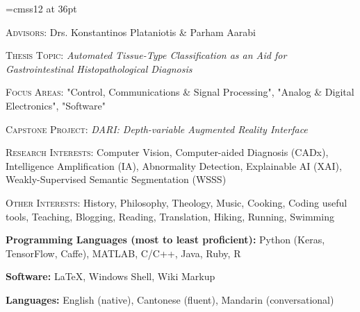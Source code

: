 \documentclass[12pt]{cv_style}
\begin{document}
\font\titlefont=cmss12 at 36pt


\flushleft{}
\begin{ditem}
	\item \textsc{Advisors:} Drs. Konstantinos Plataniotis \& Parham Aarabi
	\item \textsc{Thesis Topic:} \textit{Automated Tissue-Type Classification as an Aid for Gastrointestinal Histopathological Diagnosis}
\end{ditem}
\medspace
{}
\begin{ditem}
	\item \textsc{Focus Areas:} "Control, Communications \& Signal Processing", "Analog \& Digital Electronics", "Software"
	\item \textsc{Capstone Project:} \textit{DARI: Depth-variable Augmented Reality Interface}	
\end{ditem}

\begin{ditem}
	\item \textsc{Research Interests:} Computer Vision, Computer-aided Diagnosis (CADx), Intelligence Amplification (IA), Abnormality Detection, Explainable AI (XAI), Weakly-Supervised Semantic Segmentation (WSSS)
	\item \textsc{Other Interests:} History, Philosophy, Theology, Music, Cooking, Coding useful tools, Teaching, Blogging, Reading, Translation, Hiking, Running, Swimming
\end{ditem}

\begin{ditem}
	\item \textbf{Programming Languages (most to least proficient):} Python (Keras, TensorFlow, Caffe), MATLAB, C/C++, Java, Ruby, R
	\item \textbf{Software:} \LaTeX, Windows Shell, Wiki Markup
	\item \textbf{Languages:} English (native), Cantonese (fluent), Mandarin (conversational)
\end{ditem}
\end{document}
